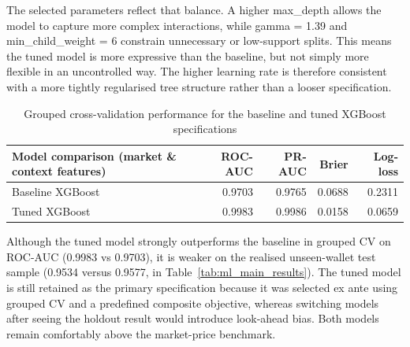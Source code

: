 \documentclass[11pt,a4paper]{article}
\newcommand{\edit}[1]{#1}
\begin{document}
The selected parameters reflect that balance. A higher max\_depth allows the model to capture more complex interactions, while gamma = 1.39 and min\_child\_weight = 6 constrain unnecessary or low-support splits. This means the tuned model is more expressive than the baseline, but not simply more flexible in an uncontrolled way. The higher learning rate is therefore consistent with a more tightly regularised tree structure rather than a looser specification.\\[-1em]
\begin{table}[H]
\centering
\small
\begin{tabular}{lrrrr}
\toprule
Model comparison (market \& context features) & ROC-AUC & PR-AUC & Brier & Log-loss \\
\midrule
Baseline XGBoost            & 0.9703 & 0.9765 & 0.0688 & 0.2311 \\
Tuned XGBoost          & 0.9983 & 0.9986 & 0.0158 & 0.0659 \\
\bottomrule
\end{tabular}
\caption{\edit{Grouped cross-validation performance for the baseline and tuned XGBoost specifications}}
\label{tab:ml_cv_results}
\end{table}

\edit{Although the tuned model strongly outperforms the baseline in grouped CV on ROC-AUC (0.9983 vs 0.9703), it is weaker on the realised unseen-wallet test sample (0.9534 versus 0.9577, in Table~\ref{tab:ml_main_results}). The tuned model is still retained as the primary specification because it was selected ex ante using grouped CV and a predefined composite objective, whereas switching models after seeing the holdout result would introduce look-ahead bias. Both models remain comfortably above the market-price benchmark.}
\end{document}
